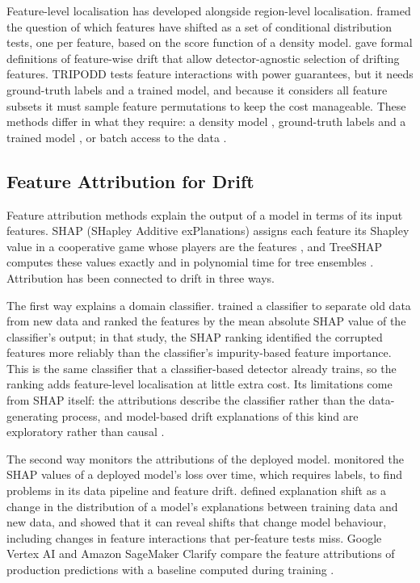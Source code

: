 Feature-level localisation has developed alongside region-level localisation. \citet{Kulinski2020} framed the question of which features have shifted as a set of conditional distribution tests, one per feature, based on the score function of a density model. \citet{HinderFeature2024} gave formal definitions of feature-wise drift that allow detector-agnostic selection of drifting features. TRIPODD \citep{TRIPODD2024} tests feature interactions with power guarantees, but it needs ground-truth labels and a trained model, and because it considers all feature subsets it must sample feature permutations to keep the cost manageable. These methods differ in what they require: a density model \citep{Kulinski2020}, ground-truth labels and a trained model \citep{TRIPODD2024}, or batch access to the data \citep{HinderFeature2024}.

\subsection{Feature Attribution for Drift}
Feature attribution methods explain the output of a model in terms of its input features. SHAP (SHapley Additive exPlanations) assigns each feature its Shapley value \citep{Shapley1953} in a cooperative game whose players are the features \citep{Lundberg2017}, and TreeSHAP computes these values exactly and in polynomial time for tree ensembles \citep{LundbergInteraction2020}. Attribution has been connected to drift in three ways.

The first way explains a domain classifier. \citet{Maggio2021} trained a classifier to separate old data from new data and ranked the features by the mean absolute SHAP value of the classifier's output; in that study, the SHAP ranking identified the corrupted features more reliably than the classifier's impurity-based feature importance. This is the same classifier that a classifier-based detector already trains, so the ranking adds feature-level localisation at little extra cost. Its limitations come from SHAP itself: the attributions describe the classifier rather than the data-generating process, and model-based drift explanations of this kind are exploratory rather than causal \citep{CausalDrift2025}.

The second way monitors the attributions of the deployed model. \citet{LundbergInteraction2020} monitored the SHAP values of a deployed model's loss over time, which requires labels, to find problems in its data pipeline and feature drift. \citet{Mougan2025} defined explanation shift as a change in the distribution of a model's explanations between training data and new data, and showed that it can reveal shifts that change model behaviour, including changes in feature interactions that per-feature tests miss. Google Vertex AI and Amazon SageMaker Clarify compare the feature attributions of production predictions with a baseline computed during training \citep{TalySato2021, AWSSageMaker2025}.

